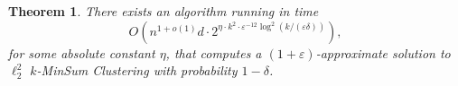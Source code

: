 \documentclass[10pt,a4paper]{amsart}
\newtheorem{theorem}{Theorem}[section]
\begin{document}





\begin{theorem}
    There exists an algorithm running in time
    $$O\left(n^{1+o(1)}d\cdot  2^{\eta\cdot k^2 \cdot \varepsilon^{-12} \log^2(k/(\varepsilon\delta))}\right),$$ 
    for some absolute constant $\eta$, that computes a $(1+\varepsilon)$-approximate solution to $\ell_2^2$ $k$-MinSum Clustering with probability $1-\delta$.
\end{theorem}
\end{document}
